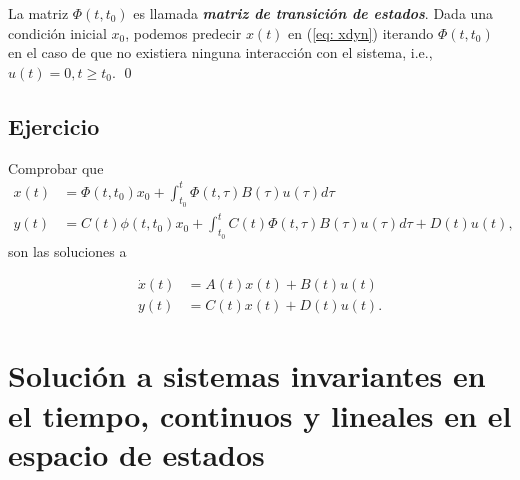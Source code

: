 La matriz $\Phi(t,t_0)$ es llamada \textbf{\emph{matriz de transición de estados}}. Dada una condición inicial $x_0$, podemos predecir $x(t)$ en (\ref{eq: xdyn}) iterando $\Phi(t,t_0)$ en el caso de que no existiera ninguna interacción con el sistema, i.e., $u(t) = 0, t\geq t_0$.
\qed

\subsection*{Ejercicio}
Comprobar que
\begin{align}
	x(t) &= \Phi(t,t_0)x_0 + \int_{t_0}^t \Phi(t,\tau)B(\tau)u(\tau)d\tau  \label{eq: solx} \\
	y(t) &= C(t)\phi(t,t_0)x_0 + \int_{t_0}^t C(t)\Phi(t,\tau)B(\tau)u(\tau)d\tau + D(t)u(t), \label{eq: soly}
\end{align}
son las soluciones a

\begin{align}
	\dot x(t) &= A(t)x(t) + B(t)u(t)  \nonumber \\
	y(t) &= C(t)x(t) + D(t)u(t).  \nonumber
\end{align}

\section[Solución a sistemas LTI en el espacio de estados]{Solución a sistemas invariantes en el tiempo, continuos y lineales en el espacio de estados}\label{5:lti}

